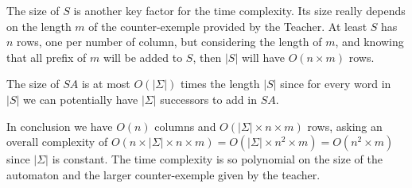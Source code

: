 The size of $S$ is another key factor for the time complexity. Its size really depends on the length $m$ of the counter-exemple provided by the Teacher. At least $S$ has $n$ rows, one per number of column, but considering the length of $m$, and knowing that all prefix of $m$ will be added to $S$, then $|S|$ will have $O(n \times m)$ rows.

The size of $SA$ is at most $O(|\Sigma|)$ times the length $|S|$ since for every word in $|S|$ we can potentially have $|\Sigma|$ successors to add in $SA$.

In conclusion we have $O(n)$ columns and $O(|\Sigma| \times n \times m)$ rows, asking an overall complexity of $O(n \times |\Sigma| \times n \times m) = O(|\Sigma| \times n^2 \times m) = O(n^2 \times m)$ since $|\Sigma|$ is constant. The time complexity is so polynomial on the size of the automaton and the larger counter-exemple given by the teacher.